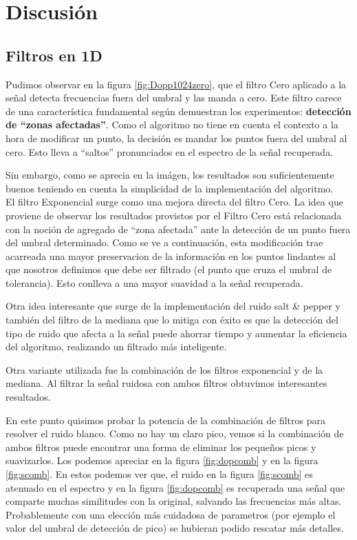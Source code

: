 \section{Discusi\'on}

\subsection{Filtros en 1D}

Pudimos observar en la figura \ref{fig:Dopp1024zero}, que el filtro Cero
aplicado a la se\~nal detecta frecuencias fuera del umbral y
las manda a cero. Este filtro carece de una caracter\'istica fundamental
seg\'un demuestran los experimentos:
{\bf detecci\'on de ``zonas afectadas''}. Como el algoritmo no tiene en
cuenta el contexto a la hora de modificar un punto, la decisi\'on es mandar los
puntos fuera del umbral al cero. Esto lleva a ``saltos'' pronunciados en
el espectro de la se\~nal recuperada.

Sin embargo, como se aprecia en la im\'agen, los resultados son suficientemente
buenos teniendo en cuenta la simplicidad de la implementaci\'on del algoritmo.\\

El filtro Exponencial surge como una mejora directa del filtro Cero.
La idea que proviene de observar los resultados provistos por el Filtro Cero est\'a relacionada con la
noci\'on de agregado de ``zona afectada'' ante la detecci\'on de un punto fuera
del umbral determinado. Como se ve a continuaci\'on, esta modificaci\'on trae
acarreada una mayor preservacion de la informaci\'on en los puntos lindantes al que nosotros
definimos que debe ser filtrado (el punto que cruza el umbral de tolerancia). Esto conlleva 
a una mayor suavidad a la se\~nal recuperada.

Otra idea interesante que surge de la implementaci\'on del ruido salt \& pepper y tambi\'en del
filtro de la mediana que lo mitiga con \'exito es que la detecci\'on del tipo de ruido que afecta
a la se\~nal puede ahorrar tiempo y aumentar la eficiencia del algoritmo, realizando un filtrado m\'as
inteligente.


Otra variante utilizada fue la combinaci\'on de los filtros exponencial y
de la mediana. Al filtrar la se\~nal ruidosa con ambos filtros obtuvimos interesantes
resultados.

En este punto quisimos probar la potencia de la combinaci\'on de filtros para resolver
el ruido blanco. Como no hay un claro pico, vemos si la combinaci\'on de ambos
filtros puede encontrar una forma de eliminar los peque\~nos picos y suavizarlos.
Los podemos apreciar en la figura \ref{fig:dopcomb} y en la figura \ref{fig:scomb}.
En estos podemos ver que, el ruido en la figura \ref{fig:scomb} es atenuado
en el espectro y en la figura \ref{fig:dopcomb} es recuperada una se\~nal que
comparte muchas similitudes con la original, salvando las frecuencias
m\'as altas. Probablemente con una elecci\'on m\'as cuidadosa de parametros (por ejemplo
el valor del umbral de detecci\'on de pico) se hubieran podido rescatar m\'as detalles.


